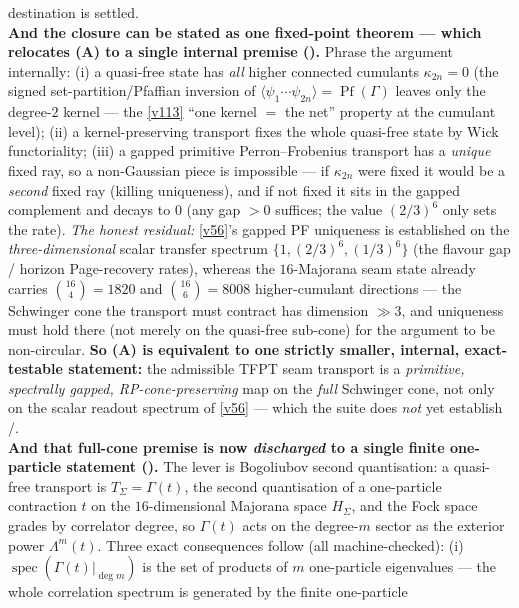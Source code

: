 \begin{keybox}
destination is settled.
\smallskip\\
\noindent\textbf{And the closure can be stated as one fixed-point theorem --- which relocates (A) to a
single internal premise ().} Phrase the argument internally:
(i) a quasi-free state has \emph{all} higher connected cumulants $\kappa_{2n}{=}0$ (the signed
set-partition/Pfaffian inversion of $\langle\psi_1\cdots\psi_{2n}\rangle=\operatorname{Pf}(\Gamma)$ leaves
only the degree-$2$ kernel --- the \vref{v113} ``one kernel $=$ the net'' property at the cumulant level);
(ii) a kernel-preserving transport fixes the whole quasi-free state by Wick functoriality; (iii) a gapped
primitive Perron--Frobenius transport has a \emph{unique} fixed ray, so a non-Gaussian piece is impossible
--- if $\kappa_{2n}$ were fixed it would be a \emph{second} fixed ray (killing uniqueness), and if not
fixed it sits in the gapped complement and decays to $0$ (any gap $>0$ suffices; the value $(2/3)^6$ only
sets the rate). \emph{The honest residual:} \vref{v56}'s gapped PF uniqueness is established on the
\emph{three-dimensional} scalar transfer spectrum $\{1,(2/3)^6,(1/3)^6\}$ (the flavour gap / horizon
Page-recovery rates), whereas the $16$-Majorana seam state already carries $\binom{16}{4}{=}1820$ and
$\binom{16}{6}{=}8008$ higher-cumulant directions --- the Schwinger cone the transport must contract has
dimension $\gg3$, and uniqueness must hold there (not merely on the quasi-free sub-cone) for the argument
to be non-circular. \textbf{So (A) is equivalent to one strictly smaller, internal, exact-testable
statement:} the admissible TFPT seam transport is a \emph{primitive, spectrally gapped, RP-cone-preserving}
map on the \emph{full} Schwinger cone, not only on the scalar readout spectrum of \vref{v56} --- which the
suite does \emph{not} yet establish \mE/\mO.
\smallskip\\
\noindent\textbf{And that full-cone premise is now \emph{discharged} to a single finite one-particle
statement ().} The lever is Bogoliubov second quantisation: a
quasi-free transport is $T_\Sigma=\Gamma(t)$, the second quantisation of a one-particle contraction $t$ on
the $16$-dimensional Majorana space $H_\Sigma$, and the Fock space grades by correlator degree, so
$\Gamma(t)$ acts on the degree-$m$ sector as the exterior power $\Lambda^m(t)$. Three exact consequences
follow (all machine-checked): (i) $\operatorname{spec}(\Gamma(t)|_{\deg m})$ is the set of products of $m$
one-particle eigenvalues --- the whole correlation spectrum is generated by the finite one-particle

\end{keybox}
